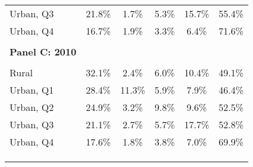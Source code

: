 \begin{tabular}{lrrrrr}
Urban, Q3 & \multicolumn{1}{c}{21.8\%} & \multicolumn{1}{c}{1.7\%} & \multicolumn{1}{c}{5.3\%} & \multicolumn{1}{c}{15.7\%} & \multicolumn{1}{c}{55.4\%} \\
Urban, Q4 & \multicolumn{1}{c}{16.7\%} & \multicolumn{1}{c}{1.9\%} & \multicolumn{1}{c}{3.3\%} & \multicolumn{1}{c}{6.4\%} & \multicolumn{1}{c}{71.6\%} \\
      &       &       &       &       &  \\
\textbf{Panel C: 2010} &       &       &       &       &  \\
      &       &       &       &       &  \\
Rural & \multicolumn{1}{c}{32.1\%} & \multicolumn{1}{c}{2.4\%} & \multicolumn{1}{c}{6.0\%} & \multicolumn{1}{c}{10.4\%} & \multicolumn{1}{c}{49.1\%} \\
Urban, Q1 & \multicolumn{1}{c}{28.4\%} & \multicolumn{1}{c}{11.3\%} & \multicolumn{1}{c}{5.9\%} & \multicolumn{1}{c}{7.9\%} & \multicolumn{1}{c}{46.4\%} \\
Urban, Q2 & \multicolumn{1}{c}{24.9\%} & \multicolumn{1}{c}{3.2\%} & \multicolumn{1}{c}{9.8\%} & \multicolumn{1}{c}{9.6\%} & \multicolumn{1}{c}{52.5\%} \\
Urban, Q3 & \multicolumn{1}{c}{21.1\%} & \multicolumn{1}{c}{2.7\%} & \multicolumn{1}{c}{5.7\%} & \multicolumn{1}{c}{17.7\%} & \multicolumn{1}{c}{52.8\%} \\
Urban, Q4 & \multicolumn{1}{c}{17.6\%} & \multicolumn{1}{c}{1.8\%} & \multicolumn{1}{c}{3.8\%} & \multicolumn{1}{c}{7.0\%} & \multicolumn{1}{c}{69.9\%} \\
      &       &       &       &       &  \\
      &       &       &       &       &  \\
\bottomrule &       &       &       &       &  \\
\end{tabular}%
